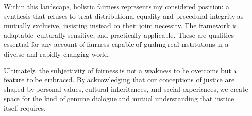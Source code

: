 \documentclass[11pt,showkeys]{../../shared/essay}
\begin{document}
Within this landscape, holistic fairness represents my considered position: a synthesis that refuses to treat distributional equality and procedural integrity as mutually exclusive, insisting instead on their joint necessity. The framework is adaptable, culturally sensitive, and practically applicable. These are qualities essential for any account of fairness capable of guiding real institutions in a diverse and rapidly changing world.

Ultimately, the subjectivity of fairness is not a weakness to be overcome but a feature to be embraced. By acknowledging that our conceptions of justice are shaped by personal values, cultural inheritances, and social experiences, we create space for the kind of genuine dialogue and mutual understanding that justice itself requires.


\end{document}

